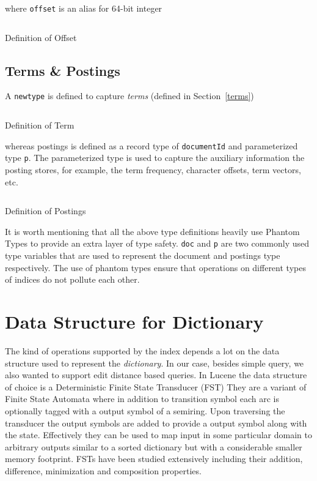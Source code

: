 \pagebreak
\noindent where \texttt{offset} is an alias for 64-bit integer
\begin{listing}
\inputminted{haskell}{hs/offset.hs}
\caption{Definition of Offset}
\end{listing}

\subsection{Terms \& Postings}
A \texttt{newtype} is defined to capture \textit{terms} (defined in Section~\ref{terms})
\begin{listing}
\inputminted{haskell}{hs/term.hs}
\caption{Definition of Term}
\end{listing}

\noindent whereas postings is defined as a record type of \texttt{documentId} and parameterized type \texttt{p}.
The parameterized type is used to capture the auxiliary information the posting stores, for example,
the term frequency, character offsets, term vectors, etc.
\begin{listing}
\inputminted{haskell}{hs/postings.hs}
\caption{Definition of Postings}
\end{listing}

It is worth mentioning that all the above type definitions heavily use Phantom Types\cite{cheney2003phantom} to provide an extra layer of type safety.
\texttt{doc} and \texttt{p} are two commonly used type variables that are used to represent the document and postings type respectively.
The use of phantom types ensure that operations on different types of indices do not pollute each other.


\section{Data Structure for Dictionary}
The kind of operations supported by the index depends a lot on the data structure used to represent the \textit{dictionary}.
In our case, besides simple query, we also wanted to support edit distance based queries.
In Lucene\cite{mccandless2012fst} the data structure of choice is a Deterministic Finite State Transducer\cite{mohri2004weighted} (FST)
They are a variant of Finite State Automata where in addition to transition symbol each arc is optionally tagged with a output symbol of a semiring.
Upon traversing the transducer the output symbols are added to provide a output symbol along with the state.
Effectively they can be used to map input in some particular domain to arbitrary outputs similar to a sorted dictionary but with a considerable smaller memory footprint.
FSTs have been studied extensively including their addition, difference, minimization and composition properties.

